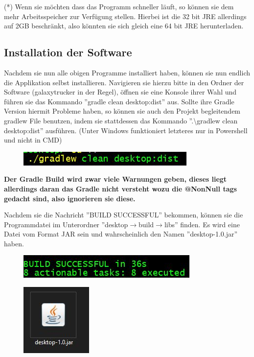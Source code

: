 \documentclass[fontsize=12pt,paper=a4,twoside]{scrartcl}
\begin{document}
(*) Wenn sie möchten dass das Programm schneller läuft, so können sie dem mehr Arbeitsspeicher zur Verfügung stellen. Hierbei ist die 32 bit JRE allerdings auf 2GB beschränkt, also könnten sie sich gleich eine 64 bit JRE herunterladen.


\subsection{Installation der Software}

Nachdem sie nun alle obigen Programme installiert haben, können sie nun endlich die Applikation selbst installieren. Navigieren sie hierzu bitte in den Ordner der Software (galaxytrucker in der Regel), öffnen sie eine Konsole ihrer Wahl und führen sie das Kommando ''gradle clean desktop:dist'' aus. Sollte ihre Gradle Version hiermit Probleme haben, so können sie auch den Projekt begleitendem gradlew File benutzen, indem sie stattdessen das Kommando ''.\textbackslash gradlew clean desktop:dist'' ausführen. (Unter Windows funktioniert letzteres nur in Powershell und nicht in CMD)  
\begin{figure}[h!]
\centering
\includegraphics[width=0.5\linewidth]{command.JPG}
\end{figure} 
\textbf{Der Gradle Build wird zwar viele Warnungen geben, dieses liegt allerdings daran das Gradle nicht versteht wozu die @NonNull tags gedacht sind, also ignorieren sie diese.}

Nachdem sie die Nachricht ''BUILD SUCCESSFUL'' bekommen, können sie die Programmdatei im Unterordner ''desktop$\rightarrow$build$\rightarrow$libs'' finden. Es wird eine Datei vom Format JAR sein und wahrscheinlich den Namen ''desktop-1.0.jar'' haben.

\begin{figure}[h!]
\centering
\includegraphics[width=0.5\linewidth]{gradle_build.JPG}
\end{figure} 

\begin{figure}[h!]
\centering
\includegraphics[width=0.5\linewidth]{application.JPG}
\end{figure} 
\end{document}
